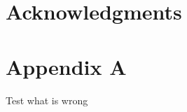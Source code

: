 \documentclass{sig-alternate}
\begin{document}
\section{Acknowledgments}

%

%
%
\appendix
\section{Appendix A}
\label{sec:plots}

Test what is wrong
\end{document}
